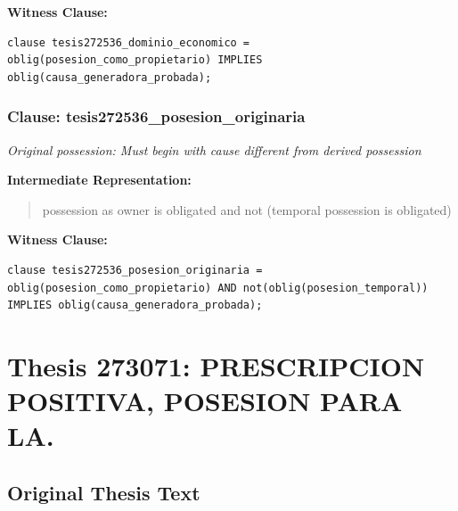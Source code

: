 \documentclass[11pt,a4paper]{article}
\begin{document}
\textbf{Witness Clause:}

\begin{lstlisting}[style=witnessstyle, language=Witness]
clause tesis272536_dominio_economico = oblig(posesion_como_propietario) IMPLIES oblig(causa_generadora_probada);
\end{lstlisting}

\subsubsection{Clause: tesis272536\_posesion\_originaria}

\textit{Original possession: Must begin with cause different from derived possession}

\textbf{Intermediate Representation:}

\begin{quote}
possession as owner is obligated and not (temporal possession is obligated)
\end{quote}

\textbf{Witness Clause:}

\begin{lstlisting}[style=witnessstyle, language=Witness]
clause tesis272536_posesion_originaria = oblig(posesion_como_propietario) AND not(oblig(posesion_temporal)) IMPLIES oblig(causa_generadora_probada);
\end{lstlisting}

\newpage

\section{Thesis 273071: PRESCRIPCION POSITIVA, POSESION PARA LA.}
\label{thesis:273071}

\subsection{Original Thesis Text}
\end{document}
